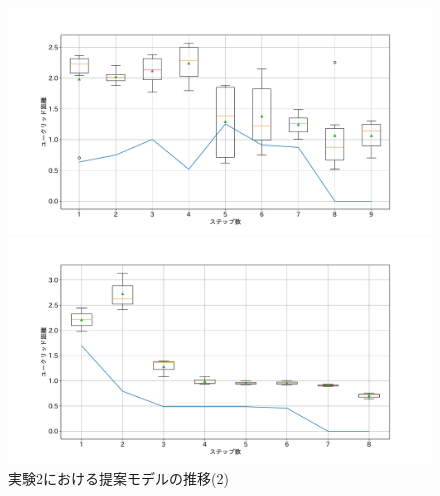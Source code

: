 \begin{figure}[h]
\begin{minipage}[b]{0.48\linewidth}
 \end{minipage}\\
 \begin{minipage}[b]{0.48\linewidth}
  \centering
  \includegraphics[scale=0.15]{./imgs/gaChange/sofa1_8.pdf}
 \end{minipage}
 \begin{minipage}[b]{0.48\linewidth}
  \centering
  \includegraphics[scale=0.15]{./imgs/gaChange/sofa2_8.pdf}
 \end{minipage}
 \caption{実験2における提案モデルの推移(2)}\label{fig:gaChange2_2}
\end{figure}

